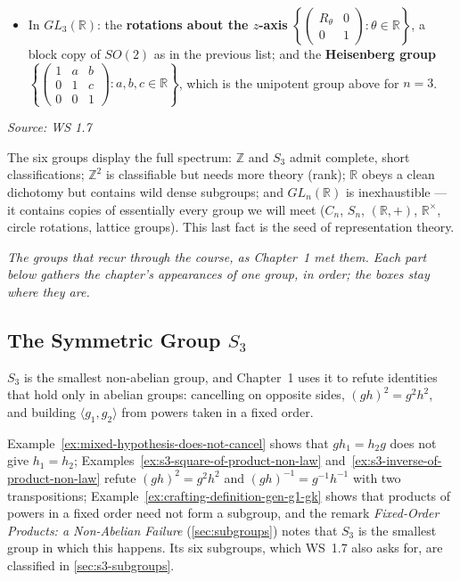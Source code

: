 \documentclass[11pt]{report}
\newcommand{\srcline}[1]{\par\hfill{\footnotesize\textit{Source: #1}}}
\begin{document}
\begin{exbox}
\begin{itemize}[nosep]
    \item In $GL_3(\mathbb{R})$: the \textbf{rotations about the $z$-axis} $\left\{ \begin{pmatrix} R_\theta & 0 \\ 0 & 1 \end{pmatrix} : \theta \in \mathbb{R} \right\}$, a block copy of $SO(2)$ as in the previous list; and the \textbf{Heisenberg group} $\left\{ \begin{pmatrix} 1 & a & b \\ 0 & 1 & c \\ 0 & 0 & 1 \end{pmatrix} : a, b, c \in \mathbb{R} \right\}$, which is the unipotent group above for $n = 3$.
\end{itemize}
\srcline{WS 1.7}
\end{exbox}

\begin{rembox}[Summary of WS 1.7]\label{rem:summary-ws-1-7}
The six groups display the full spectrum: $\mathbb{Z}$ and $S_3$ admit complete, short classifications; $\mathbb{Z}^2$ is classifiable but needs more theory (rank); $\mathbb{R}$ obeys a clean dichotomy but contains wild dense subgroups; and $GL_n(\mathbb{R})$ is inexhaustible --- it contains copies of essentially every group we will meet ($C_n$, $S_n$, $(\mathbb{R}, +)$, $\mathbb{R}^\times$, circle rotations, lattice groups). This last fact is the seed of representation theory.
\end{rembox}

\label{sec:rev-ch1}
\textit{The groups that recur through the course, as Chapter~1 met them. Each part below gathers the chapter's appearances of one group, in order; the boxes stay where they are.}

\subsection{\texorpdfstring{The Symmetric Group $S_3$}{The Symmetric Group S₃}}\label{sec:rev-ch1-s3}

$S_3$ is the smallest non-abelian group, and Chapter~1 uses it to refute identities that hold only in abelian groups: cancelling on opposite sides, $(gh)^2 = g^2h^2$, and building $\langle g_1, g_2 \rangle$ from powers taken in a fixed order.

Example~\ref{ex:mixed-hypothesis-does-not-cancel} shows that $gh_1 = h_2g$ does not give $h_1 = h_2$; Examples~\ref{ex:s3-square-of-product-non-law} and~\ref{ex:s3-inverse-of-product-non-law} refute $(gh)^2 = g^2h^2$ and $(gh)^{-1} = g^{-1}h^{-1}$ with two transpositions; Example~\ref{ex:crafting-definition-gen-g1-gk} shows that products of powers in a fixed order need not form a subgroup, and the remark \emph{Fixed-Order Products: a Non-Abelian Failure} (\ref{sec:subgroups}) notes that $S_3$ is the smallest group in which this happens. Its six subgroups, which WS~1.7 also asks for, are classified in \ref{sec:s3-subgroups}.
\end{document}
